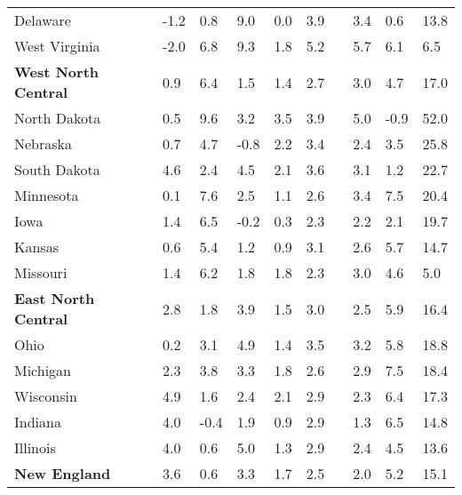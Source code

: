 {\begin{tabular}{p{30mm} R{7mm} R{7mm} R{7mm} R{7mm} 
             R{7mm} p{0mm} R{8mm} R{9mm} R{10mm} }
\hspace{3mm}  Delaware  & -1.2 & 0.8 & 9.0 & 0.0 & 3.9 &  & 3.4 & 0.6 & 13.8 \\
\hspace{3mm}  West Virginia  & -2.0 & 6.8 & 9.3 & 1.8 & 5.2 &  & 5.7 & 6.1 & 6.5 \\
\hspace{1mm} \textbf{West North Central}  & 0.9 & 6.4 & 1.5 & 1.4 & 2.7 &  & 3.0 & 4.7 & 17.0 \\
\hspace{3mm}  North Dakota  & 0.5 & 9.6 & 3.2 & 3.5 & 3.9 &  & 5.0 & -0.9 & 52.0 \\
\hspace{3mm}  Nebraska  & 0.7 & 4.7 & -0.8 & 2.2 & 3.4 &  & 2.4 & 3.5 & 25.8 \\
\hspace{3mm}  South Dakota  & 4.6 & 2.4 & 4.5 & 2.1 & 3.6 &  & 3.1 & 1.2 & 22.7 \\
\hspace{3mm}  Minnesota  & 0.1 & 7.6 & 2.5 & 1.1 & 2.6 &  & 3.4 & 7.5 & 20.4 \\
\hspace{3mm}  Iowa  & 1.4 & 6.5 & -0.2 & 0.3 & 2.3 &  & 2.2 & 2.1 & 19.7 \\
\hspace{3mm}  Kansas  & 0.6 & 5.4 & 1.2 & 0.9 & 3.1 &  & 2.6 & 5.7 & 14.7 \\
\hspace{3mm}  Missouri  & 1.4 & 6.2 & 1.8 & 1.8 & 2.3 &  & 3.0 & 4.6 & 5.0 \\
\hspace{1mm} \textbf{East North Central}  & 2.8 & 1.8 & 3.9 & 1.5 & 3.0 &  & 2.5 & 5.9 & 16.4 \\
\hspace{3mm}  Ohio  & 0.2 & 3.1 & 4.9 & 1.4 & 3.5 &  & 3.2 & 5.8 & 18.8 \\
\hspace{3mm}  Michigan  & 2.3 & 3.8 & 3.3 & 1.8 & 2.6 &  & 2.9 & 7.5 & 18.4 \\
\hspace{3mm}  Wisconsin  & 4.9 & 1.6 & 2.4 & 2.1 & 2.9 &  & 2.3 & 6.4 & 17.3 \\
\hspace{3mm}  Indiana  & 4.0 & -0.4 & 1.9 & 0.9 & 2.9 &  & 1.3 & 6.5 & 14.8 \\
\hspace{3mm}  Illinois  & 4.0 & 0.6 & 5.0 & 1.3 & 2.9 &  & 2.4 & 4.5 & 13.6 \\
\hspace{1mm} \textbf{New England}  & 3.6 & 0.6 & 3.3 & 1.7 & 2.5 &  & 2.0 & 5.2 & 15.1 \\

\end{tabular}}
